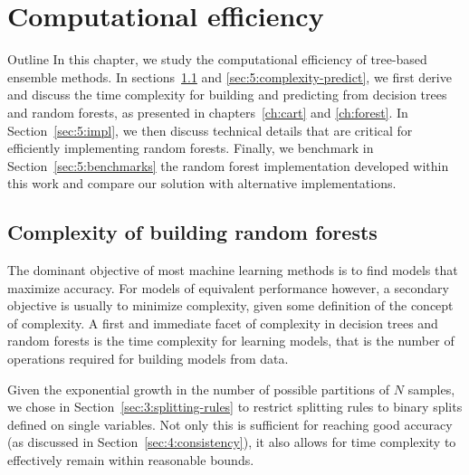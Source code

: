 \chapter{Computational efficiency}\label{ch:complexity}

\begin{remark}{Outline}
In this chapter, we study the computational efficiency of tree-based ensemble
methods. In sections~\ref{sec:5:complexity-fit} and \ref{sec:5:complexity-predict},
we first derive and discuss the time complexity for building and
predicting from decision trees and random forests, as presented in
chapters~\ref{ch:cart} and \ref{ch:forest}. In Section~\ref{sec:5:impl}, we
then discuss technical details that are critical for efficiently  implementing
random forests. Finally, we benchmark in Section~\ref{sec:5:benchmarks} the
random forest implementation developed within this work and compare our
solution with alternative implementations.
\end{remark}

\section{Complexity of building random forests}
\label{sec:5:complexity-fit}

The dominant objective of most machine learning methods is to find models that
maximize accuracy. For models of equivalent performance however, a secondary
objective is usually to minimize complexity, given some definition of the
concept of complexity. A first and immediate facet of complexity in decision
trees and random forests is the time complexity for learning models, that is
the number of operations required for building models from data.

Given the exponential growth in the number of possible partitions of $N$
samples, we chose in Section~\ref{sec:3:splitting-rules} to restrict splitting
rules to binary splits defined on single variables. Not only this is sufficient
for reaching good accuracy (as discussed in Section~\ref{sec:4:consistency}),
it also allows for time complexity to effectively remain within reasonable bounds.

